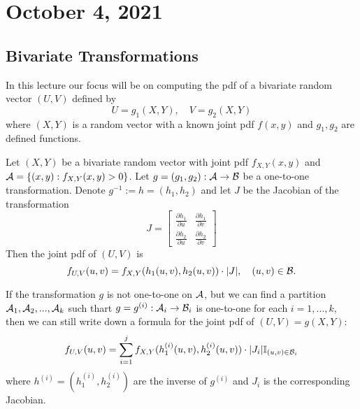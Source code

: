 \section{October 4, 2021}
\subsection{Bivariate Transformations}
In this lecture our focus will be on computing the pdf of a bivariate random vector $(U,V)$ defined by
$$
U = g_1(X,Y), \quad V = g_2(X,Y)
$$
where $(X,Y)$ is a random vector with a known joint pdf $f(x,y)$ and $g_1,g_2$ are defined functions.

\begin{theorem}
Let $(X,Y)$ be a bivariate random vector with joint pdf $f_{X,Y}(x,y)$ and $\mathcal A = \{
(x,y): f_{X,Y}(x,y)>0
\}$.
Let $g=(g_1,g_2): \mathcal A \to \mathcal B$ be a one-to-one transformation. Denote $g^{-1}:=h = (h_1,h_2)$ and let $J$ be the Jacobian of the transformation
    $$
    J = 
    \begin{bmatrix} \frac{\partial h_1}{\partial u} &
    \frac{\partial h_1}{\partial v} \\ 
    \frac{\partial h_2}{\partial u} & 
    \frac{\partial h_2}{\partial v}
    \end{bmatrix}
    $$
  Then the joint pdf of $(U,V)$ is 
  $$
  f_{U,V}(u,v) = f_{X,Y}(h_1(u,v),h_2(u,v)) \cdot |J|, \quad (u,v) \in \mathcal B.
  $$
\end{theorem}
If the transformation $g$ is not one-to-one on $\mathcal A$, but we can find a partition $\mathcal A_1,\mathcal A_2,...,\mathcal A_k$ such thart $g = g^{(i)}:\mathcal A_i \to \mathcal B_i$ is one-to-one for each $i = 1,...,k$, then we can still write down a formula for the joint pdf of $(U,V) = g(X,Y)$:
$$
f_{U,V}(u,v) = \sum_{i=1}^{j}f_{X,Y}(h_1^{(i)}(u,v),h_2^{(i)}(u,v)) \cdot |J_i|\mathbb I_{(u,v) \in \mathcal B_i}
$$
where $h^{(i)} = (h_1^{(i)},h_2^{(i)})$ are the inverse of $g^{(i)}$ and $J_i$ is the corresponding Jacobian.